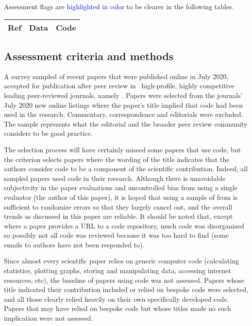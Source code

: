 \documentclass[10pt,a4paper]{article}
\begin{document}
\def\flagStyle#1{\textcolor{blue}{\sf #1}}

\noindent
Assessment flags are \flagStyle{highlighted in color} to be clearer in the following tables.\\

\noindent
\begin{center}
\sf

\end{center}

{
\begin{longtable}{@{}cp{2.8in}p{2.8in}@{}}
\sf\bfseries Ref&\sf\bfseries Data&\sf\bfseries Code \\ \hline \endhead 

\end{longtable}
}

\subsection{Assessment criteria and methods}
\label{supplement-data-methods-subsection}
A survey sampled of recent papers that were published online in July 2020, accepted for publication after peer review in \the\numberOfJournals\ high-profile, highly competitive leading peer-reviewed journals, namely \journalBreakdown. Papers were selected from the journals' July 2020 new online listings where the paper's title implied that code had been used in the research. Commentary, correspondence and editorials were excluded. The sample represents what the editorial and the broader peer review community considers to be good practice. 

The selection process will have certainly missed some papers that use code, but the criterion selects papers where the wording of the title indicates that the authors consider code to be a component of the scientific contribution. Indeed, all sampled papers used code in their research. Although there is unavoidable subjectivity in the paper evaluations and uncontrolled bias from using a single evaluator (the author of this paper), it is hoped that using a sample of  from  is sufficient to randomize errors so that they largely cancel out, and the overall trends as discussed in this paper are reliable. It should be noted that, except where a paper provides a URL to a code repository, much code was disorganized so possibly not all code was reviewed because it was too hard to find (some emails to authors have not been responded to). 
 
Since almost every scientific paper relies on generic computer code (calculating statistics, plotting graphs, storing and manipulating data, accessing internet resources, etc), the baseline of papers using code was not assessed. Papers whose title indicated their contribution included or relied on bespoke code were selected, and all those clearly relied heavily on their own specifically developed code. Papers that may have relied on bespoke code but whose titles made no such implication were not assessed.
\end{document}
